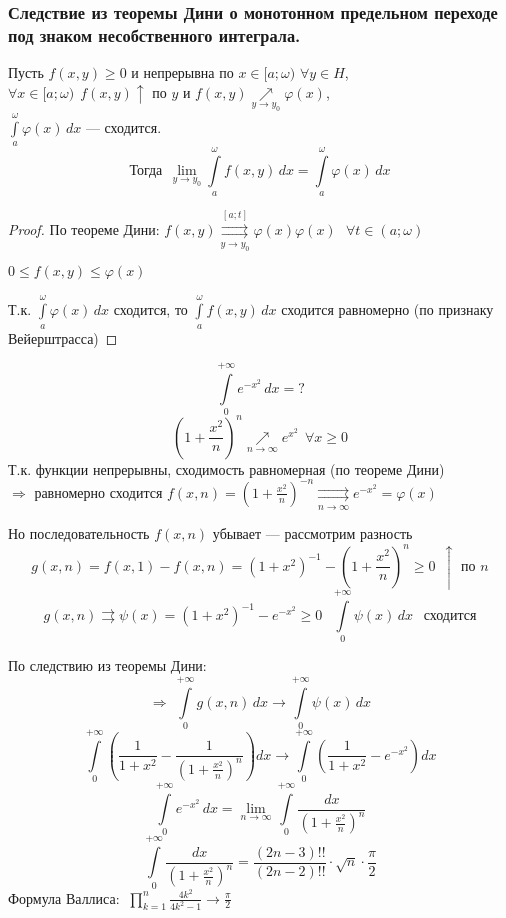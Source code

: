 \subsubsection{Следствие из теоремы Дини о монотонном предельном переходе под знаком несобственного интеграла.}
\begin{corollary}
    Пусть $f(x, y) \ge 0$ и непрерывна по $x \in [a; \omega)$ $\forall y \in H$, \\
    \phantom{Пусть} $\forall x \in [a; \omega) \ \ f(x, y) \uparrow$ по $y$ и $f(x, y) \underset{y \to y_0}{\nearrow} 
    \varphi(x)$, \\
    \phantom{Пусть} $\int\limits_a^{\omega} \varphi(x)\,dx$ --- сходится.
    \[ \text{Тогда} \ \ \lim_{y \to y_0} \int\limits_a^{\omega} f(x, y)\,dx = \int\limits_a^{\omega} \varphi(x)\,dx \]
\end{corollary}
\begin{proof}
    По теореме Дини: $f(x, y) \overset{[a; t]}{\underset{y \to y_0}{\rightrightarrows}} \varphi(x) \varphi(x) \ \ \ 
    \forall t \in (a; \omega)$
    
    $0 \le f(x, y) \le \varphi(x)$
    
    Т.к. $\int\limits_a^{\omega} \varphi(x)\,dx$ сходится, то $\int\limits_a^{\omega} f(x, y)\,dx$ сходится равномерно (по признаку Вейерштрасса) 
\end{proof}

\begin{example}
    \[ \int\limits_0^{+\infty} e^{-x^2}\,dx = ? \]
    \[ \left( 1 + \frac{x^2}{n} \right)^n \underset{n \to \infty}{\nearrow} e^{x^2} \ \ \forall x \ge 0 \]
    Т.к. функции непрерывны, сходимость равномерная (по теореме Дини) \\
    $\Rightarrow$ равномерно сходится $f(x, n) = \left( 1 + \frac{x^2}{n} \right)^{-n} 
    \underset{n \to \infty}{\rightrightarrows} e^{-x^2} = \varphi(x)$
    
    Но последовательность $f(x, n)$ убывает --- рассмотрим разность
    \[ g(x, n) = f(x, 1) - f(x, n) = \left( 1 + x^2 \right)^{-1} - \left( 1 + \frac{x^2}{n} \right)^{n} \ge 0 \ \ 
    \uparrow \text{ по } n \]
    \[ g(x, n) \rightrightarrows \psi(x) = (1  +x^2)^{-1} - e^{-x^2} \ge 0 \ \ \ \int\limits_0^{+\infty} \psi(x)\,dx \ \ 
    \text{ сходится} \]
    
    По следствию из теоремы Дини:
    \[ \Rightarrow\; \int\limits_0^{+\infty} g(x, n)\,dx \to \int\limits_0^{+\infty} \psi(x)\,dx \]
    \[ \int\limits_0^{+\infty} \left( \frac1{1 + x^2} - \frac1{\left( 1 + \frac{x^2}n \right)^n} \right) dx \to
    \int\limits_0^{+\infty} \left( \frac1{1 + x^2} - e^{-x^2} \right) dx \]
    \[ \int\limits_0^{+\infty} e^{-x^2}\,dx = 
    \lim_{n \to \infty} \int\limits_0^{+\infty} \frac{dx}{\left( 1 + \frac{x^2}n \right)^n} \]
    \[ \int\limits_0^{+\infty} \frac{dx}{\left( 1 + \frac{x^2}n \right)^n} = 
    \frac{(2n - 3)!!}{(2n - 2)!!} \cdot \sqrt{n} \cdot \frac{\pi}2 \]
    Формула Валлиса: $\ \prod\limits_{k = 1}^n \frac{4k^2}{4k^2 - 1} \to \frac{\pi}2$
\end{example}

